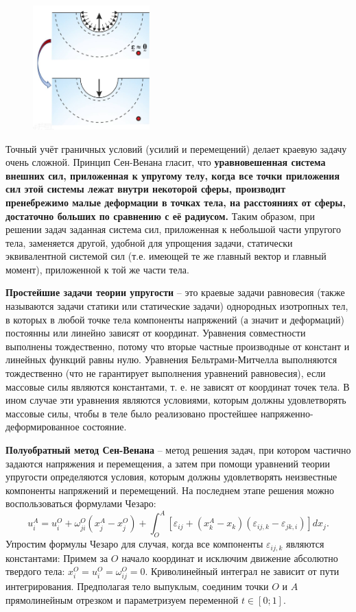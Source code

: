 \begin{figure}[h!]
  \centering
  \includegraphics[width=0.4\textwidth]{images/14.1.jpg}   
\end{figure}


Точный учёт граничных условий (усилий и перемещений) делает краевую
задачу очень сложной. Принцип Сен-Венана гласит, что \textbf{уравновешенная
система внешних сил, приложенная к упругому телу, когда все точки
приложения сил этой системы лежат внутри некоторой сферы, производит
пренебрежимо малые деформации в точках тела, на расстояниях от
сферы, достаточно больших по сравнению с её радиусом.} Таким образом,
при решении задач заданная система сил, приложенная к небольшой части
упругого тела, заменяется другой, удобной для упрощения задачи,
статически эквивалентной системой сил (т.е. имеющей те же главный
вектор и главный момент), приложенной к той же части тела.


\textbf{Простейшие задачи теории упругости} – это краевые задачи равновесия (также называются задачи статики или статические задачи) однородных изотропных тел, в которых в любой точке тела
компоненты напряжений (а значит и деформаций) постоянны или линейно зависят от координат.
Уравнения совместности выполнены тождественно, потому что вторые частные производные от констант
и линейных функций равны нулю. Уравнения Бельтрами-Митчелла выполняются тождественно (что не гарантирует выполнения уравнений равновесия), если
массовые силы являются константами, т. е. не зависят от координат точек тела. В ином случае эти
уравнения являются условиями, которым должны удовлетворять массовые силы, чтобы в теле было
реализовано простейшее напряженно-деформированное состояние.


\textbf{Полуобратный метод Сен-Венана} – метод решения задач, при котором частично задаются напряжения и
перемещения, а затем при помощи уравнений теории упругости определяются условия, которым должны
удовлетворять неизвестные компоненты напряжений и перемещений. На последнем этапе решения
можно воспользоваться формулами Чезаро:
$$
u_i^A=u_i^O+\omega_{j i}^O\left(x_j^A-x_j^O\right)+\int_O^A\left[\varepsilon_{i j}+\left(x_k^A-x_k\right)\left(\varepsilon_{i j, k}-\varepsilon_{j k, i}\right)\right] d x_j.
$$
Упростим формулы Чезаро для случая, когда все компоненты $\varepsilon_{i j, k}$ являются константами: 
Примем за $O$ начало координат и исключим движение абсолютно твердого тела: $x_i^O=u_i^O=\omega_{i j}^O=0$.
Криволинейный интеграл не зависит от пути интегрирования. Предполагая тело выпуклым, соединим точки $O$ и $A$ прямолинейным отрезком и параметризуем переменной $t \in[0 ; 1]$.


